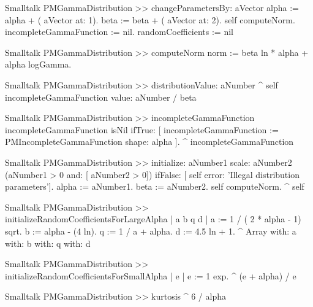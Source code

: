 \begin{displaycode}{Smalltalk}
PMGammaDistribution >> changeParametersBy: aVector
    alpha := alpha + ( aVector at: 1).
    beta := beta + ( aVector at: 2).
    self computeNorm.
    incompleteGammaFunction := nil.
    randomCoefficients := nil
\end{displaycode}
    
\begin{displaycode}{Smalltalk}
PMGammaDistribution >> computeNorm
    norm := beta ln * alpha + alpha logGamma.
\end{displaycode}

\begin{displaycode}{Smalltalk}
PMGammaDistribution >> distributionValue: aNumber
    ^ self incompleteGammaFunction value: aNumber / beta
\end{displaycode}

\begin{displaycode}{Smalltalk}
PMGammaDistribution >> incompleteGammaFunction
    incompleteGammaFunction isNil 
        ifTrue: 
            [ incompleteGammaFunction := PMIncompleteGammaFunction 
                                                        shape: alpha ].
    ^ incompleteGammaFunction
\end{displaycode}

\begin{displaycode}{Smalltalk}
PMGammaDistribution >> initialize: aNumber1 scale: aNumber2
    (aNumber1 > 0 and: [ aNumber2 > 0])
        ifFalse: [ self error: 'Illegal distribution parameters'].
    alpha := aNumber1.
    beta := aNumber2.
    self computeNorm.
    ^ self
\end{displaycode}

\begin{displaycode}{Smalltalk}
PMGammaDistribution >> initializeRandomCoefficientsForLargeAlpha
    | a b q d |
    a := 1 / ( 2 * alpha - 1) sqrt.
    b := alpha - (4 ln).
    q := 1 / a + alpha.
    d := 4.5 ln + 1.
    ^ Array with: a with: b with: q with: d
\end{displaycode}
    
\begin{displaycode}{Smalltalk}
PMGammaDistribution >> initializeRandomCoefficientsForSmallAlpha
    | e |
    e := 1 exp.
    ^ (e + alpha) / e
\end{displaycode}

\begin{displaycode}{Smalltalk}
PMGammaDistribution >> kurtosis
    ^ 6 / alpha
\end{displaycode}

